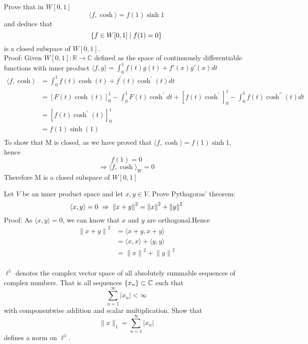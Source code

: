 \documentclass [12pt,letterpaper]{exam}
\begin{document}
\begin{questions}
\question %
Prove that in $W[0,1]$
$$
\langle f, \cosh\rangle = f(1)\sinh 1
$$
and deduce that
$$
\{ f\in W[0,1]\thickspace | \thickspace f(1)=0\}
$$
is a closed subspace of $W[0,1]$.\\

Proof: Given $W[0,1]: \mathbb{R} \rightarrow \mathbb{C}$ defined as the space of continuously differentiable functions with inner product $\langle f,g\rangle = \int_{0}^{1} f(t)g(t)+f'(x)g'(x) dt$
\begin{equation}
\begin{split}
\langle f, \cosh\rangle & = \int_{0}^{1} f(t) \cosh(t) + f^{'}(t) \cosh^{'}(t)dt\\
& = [F(t)\cosh(t)]_{0}^{1} - \int_{0}^{1} F(t)\cosh^{'}dt + [f(t)\cosh^{'}]_{0}^{1} - \int_{0}^{1}f(t)\cosh^{''}(t)dt\\
& = [f(t)\cosh^{'}(t)]_{0}^{1}\\
& = f(1)\sinh(1)\\
\end{split}
\end{equation}
To show that M is closed, as we have proved that $\langle f, \cosh\rangle = f(1)\sinh 1$, hence $$f(1) = 0$$
$$\Rightarrow {\langle f, \cosh\rangle}_W = 0$$
Therefore M is a closed subspace of $W[0,1]$

\question %
Let $V$ be an inner product space and let $x,y\in V$. Prove Pythagoras' theorem:
$$
\langle x,y\rangle = 0 \thickspace\Rightarrow\thickspace {\lVert x+y\rVert}^2 = {\lVert x\rVert}^2+{\lVert y\rVert}^2
$$
Proof: As $\langle x,y\rangle = 0$, we can know that $x$ and $y$ are orthogonal.Hence\\
\begin{equation}
\begin{split}
{\lVert x + y\rVert}^2 & = \langle x + y, x + y \rangle\\
& = \langle x,x \rangle + \langle y,y\rangle\\
& = {\lVert x \rVert}^2 + {\lVert y \rVert}^2\\
\end{split}
\end{equation}


\question %
$\ell^1$ denotes the complex vector space of all absolutely summable sequences of complex numbers. That is 
all sequences $\{ x_n\}\subset\mathbb{C}$ such that 
$$
\sum_{n=1}^{\infty} \lvert x_n\rvert < \infty
$$
with componentwise addition and scalar multiplication. Show that
$$
\lVert x\rVert_1 = \sum_{n=1}^{\infty} \lvert x_n\rvert
$$
defines a norm on $\ell^1$.\\


\end{questions}
\end{document}
